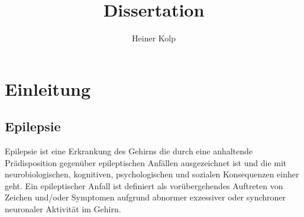 \documentclass[a4paper,11pt]{report}
\title{Dissertation}
\author{Heiner Kolp}
\begin{document}
\setlength{\parindent}{0pt}
\maketitle
\tableofcontents

\chapter{Einleitung}

\section{Epilepsie}
Epilepsie ist eine Erkrankung des Gehirns die durch eine anhaltende Prädisposition gegenüber epileptischen Anfällen ausgezeichnet ist und die mit neurobiologischen, kognitiven, psychologischen und sozialen Konsequenzen einher geht. Ein epileptischer Anfall ist definiert als vorübergehendes Auftreten von Zeichen und/oder Symptomen aufgrund abnormer exzessiver oder synchroner neuronaler Aktivität im Gehirn.\cite{Fisher.2005}\\
\end{document}
